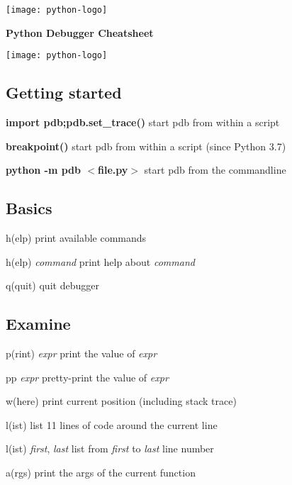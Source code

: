 \documentclass[10pt,landscape,a4paper]{article}
\newcommand{\keystroke}[1]{$<$#1$>$}
\begin{document}
  \begin{center}
    \begin{minipage}[c]{0.15\textwidth}
      \texttt{[image: python-logo]}
    \end{minipage}
    \begin{minipage}[c]{0.43\textwidth}
      \huge \bfseries Python Debugger Cheatsheet
    \end{minipage}
    \begin{minipage}[r]{0.15\textwidth}
      \texttt{[image: python-logo]}
    \end{minipage}
    \vspace{1cm}
  \end{center}

  \begin{multicols}{2}
    \subsection{Getting started}
      \begin{eqlist}
        \item[{\bfseries import pdb;pdb.set\_trace()}] start pdb from within a script
        \item[{\bfseries breakpoint()}] start pdb from within a script (since Python 3.7)
        \item[{\bfseries python -m pdb \keystroke{file.py}}] start pdb from the commandline
      \end{eqlist}

    \subsection{Basics}
      \begin{eqlist}
        \item[h(elp)] print available commands
        \item[h(elp) \textit{command}] print help about \textit{command}
        \item[q(quit)] quit debugger
      \end{eqlist}

    \subsection{Examine}
      \begin{eqlist}
        \item[p(rint) \textit{expr}] print the value of \textit{expr}
        \item[pp \textit{expr}] pretty-print the value of \textit{expr}
        \item[w(here)] print current position (including stack trace)
        \item[l(ist)] list 11 lines of code around the current line
        \item[l(ist) \textit{first}, \textit{last}] list from \textit{first} to \textit{last} line number
        \item[a(rgs)] print the args of the current function
      \end{eqlist}


\end{multicols}
\end{document}
